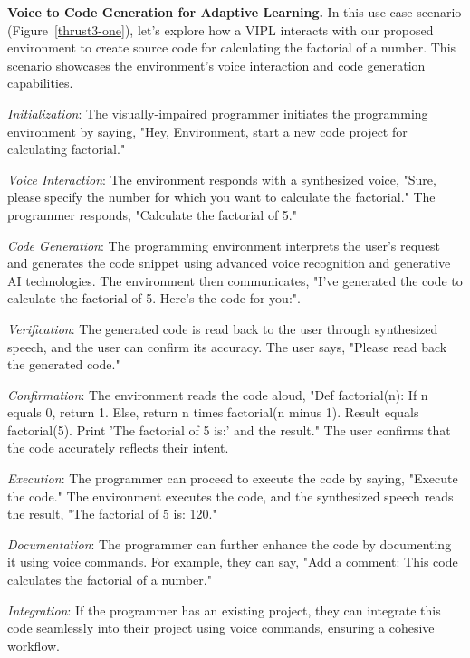 {\bf Voice to Code Generation for Adaptive Learning.} In this use case
scenario (Figure~\ref{thrust3-one}), let's explore how a VIPL
interacts with our proposed environment to create
source code for calculating the factorial of a number. This scenario
showcases the environment's voice interaction and code generation
capabilities.

{\em Initialization}: The visually-impaired programmer initiates the
programming environment by saying, "Hey, Environment, start a new code
project for calculating factorial."

{\em Voice Interaction}: The environment responds with a synthesized voice,
"Sure, please specify the number for which you want to calculate the
factorial." The programmer responds, "Calculate the factorial of 5."

{\em Code Generation}: The programming environment interprets the user's
request and generates the code snippet using advanced voice
recognition and generative AI technologies.  The environment then
communicates, "I've generated the code to calculate the factorial of
5. Here's the code for you:".

{\em Verification}: The generated code is read back to the user through synthesized speech, and the user can confirm its accuracy.
The user says, "Please read back the generated code."

{\em Confirmation}: The environment reads the code aloud, "Def factorial(n): If n equals 0, return 1. Else, return n times factorial(n minus 1). Result equals factorial(5). Print 'The factorial of 5 is:' and the result." The user confirms that the code accurately reflects their intent.

{\em Execution}: The programmer can proceed to execute the code by saying, "Execute the code." The environment executes the code, and the synthesized speech reads the result, "The factorial of 5 is: 120."

{\em Documentation}: The programmer can further enhance the code by documenting it using voice commands. For example, they can say, "Add a comment: This code calculates the factorial of a number."

{\em Integration}: If the programmer has an existing project, they can
integrate this code seamlessly into their project using voice
commands, ensuring a cohesive workflow.


